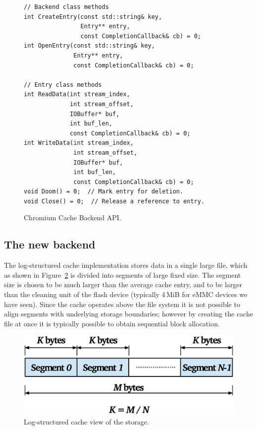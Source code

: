 \documentclass[letterpaper,twocolumn,10pt]{article}
\begin{document}
\begin{figure}[h]
{\small
\begin{verbatim}
// Backend class methods
int CreateEntry(const std::string& key,
                Entry** entry,
                const CompletionCallback& cb) = 0;
int OpenEntry(const std::string& key,
              Entry** entry,
              const CompletionCallback& cb) = 0;

// Entry class methods
int ReadData(int stream_index,
             int stream_offset,
             IOBuffer* buf,
             int buf_len,
             const CompletionCallback& cb) = 0;
int WriteData(int stream_index,
              int stream_offset,
              IOBuffer* buf,
              int buf_len,
              const CompletionCallback& cb) = 0;
void Doom() = 0;  // Mark entry for deletion.
void Close() = 0;  // Release a reference to entry.
\end{verbatim}
}
\caption{Chromium Cache Backend API.}
\label{cache-api}
\end{figure}

\subsection{The new backend}

The log-structured cache implementation stores data in a single large file,
which as shown in Figure~\ref{fig:storage} is divided into segments of large
fixed size.  The segment size is chosen to be much larger than the average cache
entry, and to be larger than the cleaning unit of the flash device (typically
4\,MiB for eMMC devices we have seen).  Since the cache operates above the file
system it is not possible to align segments with underlying storage boundaries;
however by creating the cache file at once it is typically possible to obtain
sequential block allocation.

\begin{figure}[t]
  \begin{center}
    \includegraphics[width=1.04\columnwidth]{graphs/storage}
  \end{center}
  \caption{Log-structured cache view of the storage.}
  \label{fig:storage} 
\end{figure}
\end{document}
